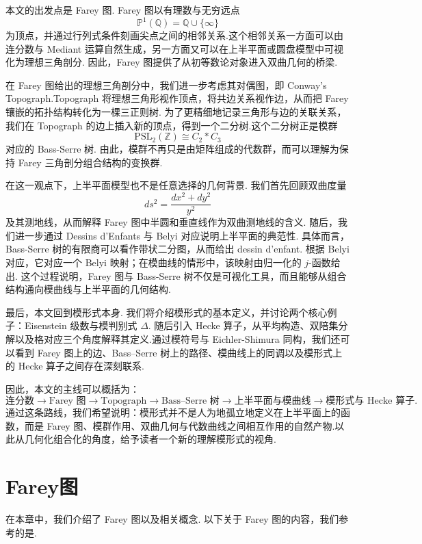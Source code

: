 \documentclass[10pt,UTF8]{ctexart}
\theoremstyle{definition}
\theoremstyle{remark}
\begin{document}
本文的出发点是 Farey 图. Farey 图以有理数与无穷远点
\[
\mathbb P^1(\mathbb Q)=\mathbb Q\cup\{\infty\}
\]
为顶点，并通过行列式条件刻画尖点之间的相邻关系.这个相邻关系一方面可以由连分数与 Mediant 运算自然生成，另一方面又可以在上半平面或圆盘模型中可视化为理想三角剖分. 因此，Farey 图提供了从初等数论对象进入双曲几何的桥梁.

在 Farey 图给出的理想三角剖分中，我们进一步考虑其对偶图，即 Conway's Topograph.Topograph 将理想三角形视作顶点，将共边关系视作边，从而把 Farey 镶嵌的拓扑结构转化为一棵三正则树. 为了更精细地记录三角形与边的关联关系，我们在 Topograph 的边上插入新的顶点，得到一个二分树.这个二分树正是模群
\[
\mathrm{PSL}_2(\mathbb Z)
\cong C_2*C_3
\]
对应的 Bass-Serre 树. 由此，模群不再只是由矩阵组成的代数群，而可以理解为保持 Farey 三角剖分组合结构的变换群.

在这一观点下，上半平面模型也不是任意选择的几何背景. 我们首先回顾双曲度量
\[
ds^2=\frac{dx^2+dy^2}{y^2}
\]
及其测地线，从而解释 Farey 图中半圆和垂直线作为双曲测地线的含义. 随后，我们进一步通过 Dessins d'Enfants 与 Belyi 对应说明上半平面的典范性. 具体而言，Bass-Serre 树的有限商可以看作带状二分图，从而给出 dessin d'enfant. 根据 Belyi 对应，它对应一个 Belyi 映射；在模曲线的情形中，该映射由归一化的 \(j\)-函数给出. 这个过程说明，Farey 图与 Bass-Serre 树不仅是可视化工具，而且能够从组合结构通向模曲线与上半平面的几何结构.

最后，本文回到模形式本身. 我们将介绍模形式的基本定义，并讨论两个核心例子：Eisenstein 级数与模判别式 \(\Delta\). 随后引入 Hecke 算子，从平均构造、双陪集分解以及格对应三个角度解释其定义.通过模符号与 Eichler-Shimura 同构，我们还可以看到 Farey 图上的边、Bass--Serre 树上的路径、模曲线上的同调以及模形式上的 Hecke 算子之间存在深刻联系.

因此，本文的主线可以概括为：
\[
\text{连分数}
\longrightarrow
\text{Farey 图}
\longrightarrow
\text{Topograph}
\longrightarrow
\text{Bass--Serre 树}
\longrightarrow
\text{上半平面与模曲线}
\longrightarrow
\text{模形式与 Hecke 算子}.
\]
通过这条路线，我们希望说明：模形式并不是人为地孤立地定义在上半平面上的函数，而是 Farey 图、模群作用、双曲几何与代数曲线之间相互作用的自然产物.以此从几何化组合化的角度，给予读者一个新的理解模形式的视角.



\section{Farey图}\label{sec:farey}
在本章中，我们介绍了 Farey 图以及相关概念. 以下关于 Farey 图的内容，我们参考的是\cite{HatcherTopologyOfNumbers}.
\end{document}
